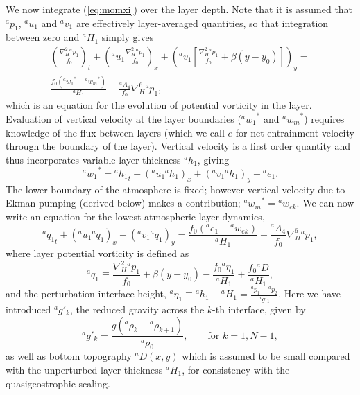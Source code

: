 \documentclass[11pt, a4paper,twoside]{article}
\newcommand{\etb}[2]{{{}^{#1}\eta_{#2}}}
\newcommand{\rhb}[1]{{{}^{#1}\rho}}
\newcommand{\gp}[2]{{}^{#1}g'_{#2}}
\newcommand{\q}[2]{{{}^{#1}q_{#2}}}
\newcommand{\p}[2]{{{}^{#1}p_{#2}}}
\newcommand{\uu}[2]{{{}^{#1}u_{#2}}}
\newcommand{\vv}[2]{{{}^{#1}v_{#2}}}
\newcommand{\ww}[2]{{{}^{#1}w_{#2}}}
\newcommand{\ek}[1]{{{}^{#1}w_{ek}}}
\newcommand{\HH}[2]{{{}^{#1}H_{#2}}}
\newcommand{\ah}[1]{{{}^{#1}A_4}}
\newcommand{\e}[2]{{{}^{#1}e_{#2}}}
\newcommand{\h}[2]{{{}^{#1}h_{#2}}}
\newcommand{\D}[1]{{}^{#1}D}
\numberwithin{equation}{section}
\begin{document}
We now integrate (\ref{eq:momxi}) over the layer depth.
Note that it is assumed that $\p{a}{1}$, $\uu{a}{1}$ and $\vv{a}{1}$ are effectively layer-averaged quantities, so that integration between zero and $\HH{a}{1}$ simply gives
\begin{multline}
\left(\frac{\nabla_H^2 \p{a}{1}}{f_0}\right)_t  + \left(\uu{a}{1} \frac{\nabla_H^2 \p{a}{1}}{f_0} \right)_x  + \left(\vv{a}{1}\left[\frac{\nabla_H^2 \p{a}{1}}{f_0} + \beta(y-y_0)\right]\right)_y  = \\
\frac{f_0 (\ww{a}{1}^* -\ww{a}{m}^*)}{\HH{a}{1}} - \frac{\ah{a}}{f_0}\nabla_H^6 \p{a}{1},
\end{multline}
which is an equation for the evolution of potential vorticity in the layer.
Evaluation of vertical velocity at the layer boundaries ($\ww{a}{1}^*$ and $\ww{a}{m}^*$) requires knowledge of the flux between layers (which we call $e$ for net entrainment velocity through the boundary of the layer).
Vertical velocity is a first order quantity and thus incorporates variable layer thickness $\h{a}{1}$, giving
\begin{equation}\label{eq:w1}
\ww{a}{1}^* =  \h{a}{1}_t + (\uu{a}{1} \h{a}{1})_x + (\vv{a}{1} \h{a}{1})_y + \e{a}{1}.
\end{equation}
The lower boundary of the atmosphere is fixed; however vertical velocity due to Ekman pumping (derived below) makes a contribution; $\ww{a}{m}^* = \ek{a}$.
We can now write an equation for the lowest atmospheric layer dynamics,
\begin{equation}\label{eq:momxl}
\q{a}{1}_t  + \left(\uu{a}{1}  \q{a}{1} \right)_x  + \left(\vv{a}{1}\q{a}{1} \right)_y  = \frac{f_0 (\e{a}{1} -\ek{a})}{\HH{a}{1}} - \frac{\ah{a}}{f_0}\nabla_H^6 \p{a}{1},
\end{equation}
where layer potential vorticity is defined as
\begin{equation}\label{eq:qa1}
\q{a}{1} \equiv \frac{\nabla_H^2 \p{a}{1}}{f_0} + \beta(y-y_0) - \frac{ f_0 \etb{a}{1} }{\HH{a}{1}} + \frac{f_0 \D{a}}{\HH{a}{1}},
\end{equation}
and the perturbation interface height, $\etb{a}{1} \equiv \h{a}{1} - \HH{a}{1} =  \frac{\p{a}{1}-\p{a}{2}}{\gp{a}{1}}$.
Here we have introduced $\gp{a}{k}$, the reduced gravity across the $k$-th interface, given by
\[\gp{a}{k} = \frac{g(\rhb{a}_k - \rhb{a}_{k+1})}{\rhb{a}_0},\quad \quad \textrm{for } k=1,N-1,\]
as well as bottom topography $\D{a}(x,y)$ which is assumed to be small compared with the unperturbed layer thickness $\HH{a}{1}$, for consistency with the quasigeostrophic scaling.
\end{document}
